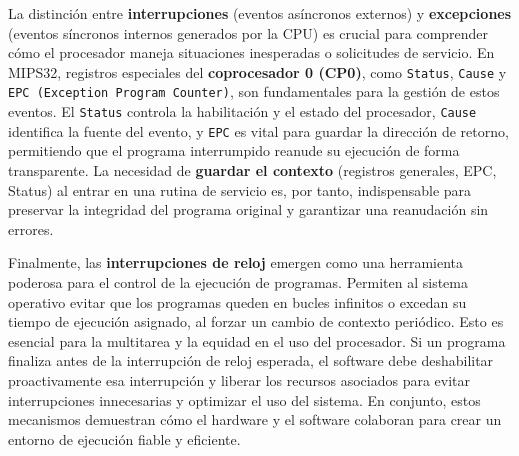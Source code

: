 \documentclass[12pt,a4paper]{article}
\begin{document}
	La distinción entre \textbf{interrupciones} (eventos asíncronos externos) y \textbf{excepciones} (eventos síncronos internos generados por la CPU) es crucial para comprender cómo el procesador maneja situaciones inesperadas o solicitudes de servicio. En MIPS32, registros especiales del \textbf{coprocesador 0 (CP0)}, como \texttt{Status}, \texttt{Cause} y \texttt{EPC (Exception Program Counter)}, son fundamentales para la gestión de estos eventos. El \texttt{Status} controla la habilitación y el estado del procesador, \texttt{Cause} identifica la fuente del evento, y \texttt{EPC} es vital para guardar la dirección de retorno, permitiendo que el programa interrumpido reanude su ejecución de forma transparente. La necesidad de \textbf{guardar el contexto} (registros generales, EPC, Status) al entrar en una rutina de servicio es, por tanto, indispensable para preservar la integridad del programa original y garantizar una reanudación sin errores.
	
	Finalmente, las \textbf{interrupciones de reloj} emergen como una herramienta poderosa para el control de la ejecución de programas. Permiten al sistema operativo evitar que los programas queden en bucles infinitos o excedan su tiempo de ejecución asignado, al forzar un cambio de contexto periódico. Esto es esencial para la multitarea y la equidad en el uso del procesador. Si un programa finaliza antes de la interrupción de reloj esperada, el software debe deshabilitar proactivamente esa interrupción y liberar los recursos asociados para evitar interrupciones innecesarias y optimizar el uso del sistema. En conjunto, estos mecanismos demuestran cómo el hardware y el software colaboran para crear un entorno de ejecución fiable y eficiente.
	
\end{document}
